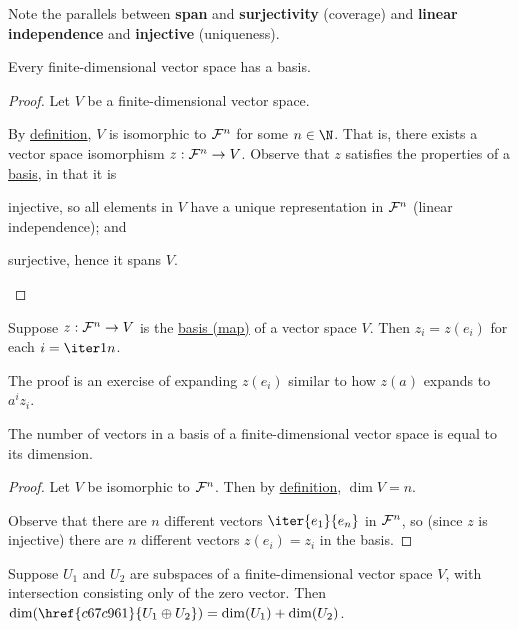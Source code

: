 \Remark{}\label{c15a2e9}

Note the parallels between \textbf{span} and \textbf{surjectivity} (coverage)
and \textbf{linear independence} and \textbf{injective} (uniqueness).

\label{a6a32d2}

Every finite-dimensional vector space has a basis.

\begin{proof}
  Let $V$ be a finite-dimensional vector space.

  By \href{c4cd6dd}{definition}, $V$ is isomorphic to $\mathcal F^n$ for some $n\in\N$.
  That is, there exists a vector space isomorphism $z:\mathcal F^n\to V$. Observe that
  $z$ satisfies the properties of a \href{db2477b}{basis}, in that it is
  \begin{enumerati}
    \item injective, so all elements in $V$ have a unique representation in
          $\mathcal F^n$ (linear independence); and
    \item surjective, hence it spans $V$.
  \end{enumerati}
\end{proof}

\label{bcdfc1a}

\cvn Suppose $z:\mathcal F^n\to V$ is the \href{f62907b}{basis (map)} of a vector space
$V$. Then $z_i=z(e_i)$ for each $i=\iter1n$.

The proof is an exercise of expanding $z(e_i)$ similar to how $z(a)$ expands to
$a^iz_i$.

\Theorem{}\label{a21cb0d}

The number of vectors in a basis of a finite-dimensional vector space is equal
to its dimension.

\begin{proof}
  Let $V$ be isomorphic to $\mathcal F^n$. Then by \href{ad4a614}{definition},
  $\dim V=n$.

  Observe that there are $n$ different vectors $\iter{e_1}{e_n}$ in $\mathcal F^n$, so
  (since $z$ is injective) there are $n$ different vectors $z(e_i)=z_i$ in the
  basis.
\end{proof}

\label{b8205cb}

Suppose $U_1$ and $U_2$ are subspaces of a finite-dimensional vector space $V$,
with intersection consisting only of the zero vector. Then
$\dim(\href{c67c961}{U_1\oplus U_2})=\dim(U_1)+\dim(U_2)$.

